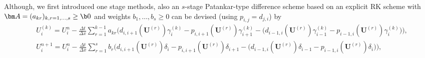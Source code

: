 \documentclass[final,11pt, times, linenumber, nopreprintline]{elsarticle}
\newcommand{\bA}{\bm A}
\newcommand{\bU}{\bm U}
\newcommand{\bF}{\bar{F}}
\newcommand{\destt}{\tilde{d}}
\newcommand{\prodt}{\tilde{p}}
\begin{document}
Although, we first introduced one stage methods, also an $s$-stage Patankar-type difference scheme based on an explicit RK scheme with $\bA = (a_{kr})_{k,r=1,\dots,s}\geq \b 0$ and weights $b_1, \dots, b_s\geq 0$ can be devised (using $p_{i,j}=d_{j,i}$) by
\begin{equation}
	\begin{split}
		&U_i^{(k)}\!\! = U_i^n - \frac{\Delta t}{\Delta x} \sum\nolimits_{r=1}^{k-1} a_{kr} \biggl(d_{i,i+1}(\bU^{(r)}) \gamma_{i}^{(k)}  - p_{i,i+1}(\bU^{(r)}) \gamma_{i+1}^{(k)} -\bigl( d_{i-1,i}(\bU^{(r)}) \gamma_{i-1}^{(k)}-p_{i-1,i}(\bU^{(r)}) \gamma_{i}^{(k)} \bigr) \biggr), \\
		&U_i^{n+1}\!\! = U_i^n - \frac{\Delta t}{\Delta x} \sum\nolimits_{r=1}^{s} b_{r} \biggl(d_{i,i+1}(\bU^{(r)}) \delta_i  - p_{i,i+1}(\bU^{(r)}) \delta_{i+1}-\bigl( d_{i-1,i}(\bU^{(r)}) \delta_{i-1}-p_{i-1,i}(\bU^{(r)}) \delta_{i} \bigr) \biggr) ,
	\end{split}
	\label{eq:NSARK_stages}
\end{equation}
\end{document}
